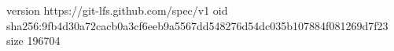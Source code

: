 version https://git-lfs.github.com/spec/v1
oid sha256:9fb4d30a72cacb0a3cf6eeb9a5567dd548276d54dc035b107884f081269d7f23
size 196704
